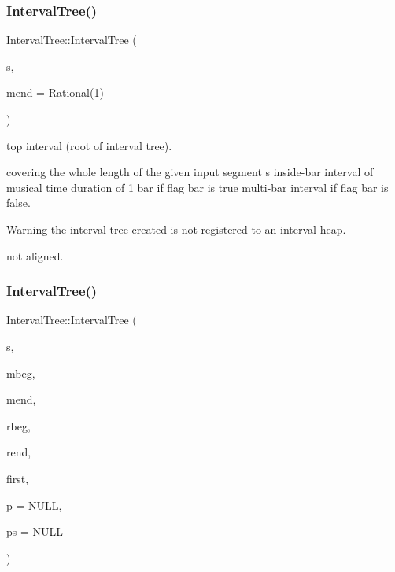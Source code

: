 \subsubsection{\texorpdfstring{IntervalTree()}{IntervalTree()}\hspace{0.1cm}{\footnotesize\ttfamily [1/2]}}
{\footnotesize\ttfamily Interval\+Tree\+::\+Interval\+Tree (\begin{DoxyParamCaption}\item[{const \mbox{\hyperlink{classInputSegment}{Input\+Segment}} $\ast$}]{s,  }\item[{\mbox{\hyperlink{classRational}{Rational}}}]{mend = {\ttfamily \mbox{\hyperlink{classRational}{Rational}}(1)} }\end{DoxyParamCaption})\hspace{0.3cm}{\ttfamily [protected]}}



top interval (root of interval tree). 

covering the whole length of the given input segment s inside-\/bar interval of musical time duration of 1 bar if flag bar is true multi-\/bar interval if flag bar is false.

\begin{DoxyWarning}{Warning}
the interval tree created is not registered to an interval heap. 

not aligned. 
\end{DoxyWarning}
\mbox{\label{group__segment_gac16f2a8d9c584a869bbed6a263914360}} 
\subsubsection{\texorpdfstring{IntervalTree()}{IntervalTree()}\hspace{0.1cm}{\footnotesize\ttfamily [2/2]}}
{\footnotesize\ttfamily Interval\+Tree\+::\+Interval\+Tree (\begin{DoxyParamCaption}\item[{const \mbox{\hyperlink{classInputSegment}{Input\+Segment}} $\ast$}]{s,  }\item[{\mbox{\hyperlink{classRational}{Rational}}}]{mbeg,  }\item[{\mbox{\hyperlink{classRational}{Rational}}}]{mend,  }\item[{double}]{rbeg,  }\item[{double}]{rend,  }\item[{size\+\_\+t}]{first,  }\item[{\mbox{\hyperlink{classIntervalTree}{Interval\+Tree}} $\ast$}]{p = {\ttfamily NULL},  }\item[{\mbox{\hyperlink{classIntervalTree}{Interval\+Tree}} $\ast$}]{ps = {\ttfamily NULL} }\end{DoxyParamCaption})\hspace{0.3cm}{\ttfamily [protected]}}



